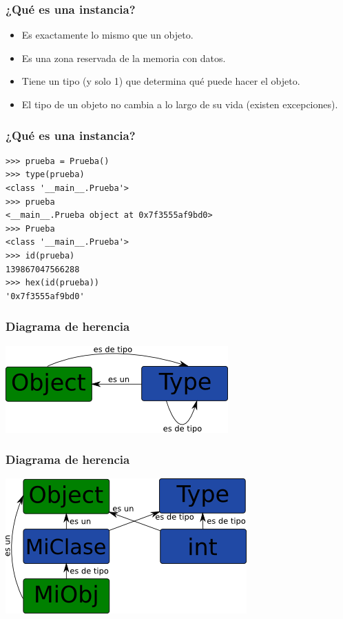 \documentclass[10pt]{beamer}
\begin{document}
  \begin{frame}[containsverbatim]
    \frametitle{¿Qué es una instancia?}
    \begin{itemize}
      \item Es exactamente lo mismo que un objeto.
      \item Es una zona reservada de la memoria con datos.
      \item Tiene un tipo (y solo 1) que determina qué puede hacer el objeto.
      \item El tipo de un objeto no cambia a lo largo de su vida (existen excepciones).
    \end{itemize}
  \end{frame}

  \begin{frame}[containsverbatim]
    \frametitle{¿Qué es una instancia?}
    \begin{verbatim}
>>> prueba = Prueba()
>>> type(prueba)
<class '__main__.Prueba'>
>>> prueba
<__main__.Prueba object at 0x7f3555af9bd0>
>>> Prueba
<class '__main__.Prueba'>
>>> id(prueba)
139867047566288
>>> hex(id(prueba))
'0x7f3555af9bd0'
    \end{verbatim}
  \end{frame}

  \begin{frame}[containsverbatim]
    \frametitle{Diagrama de herencia}
    \begin{center}\includegraphics{img/Object-Type-Relation.png}\end{center}
  \end{frame}

  \begin{frame}[containsverbatim]
    \frametitle{Diagrama de herencia}
    \begin{center}\includegraphics{img/MyClass-BuiltinClass-Relation.png}\end{center}
  \end{frame}
\end{document}
